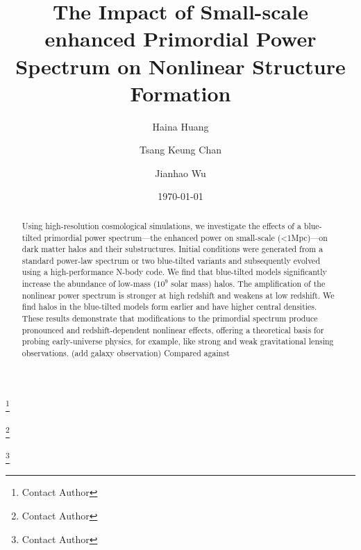\documentclass[
 reprint,
 superscriptaddress,
 nofootinbib,
 nobibnotes,
 amsmath,
 amssymb,
 aps,
 prd,
 floatfix,
 longbibliography
]{revtex4-1}
\begin{document}
\title{The Impact of Small-scale enhanced Primordial Power Spectrum on Nonlinear Structure Formation}

\author{Haina Huang}
\thanks{\scriptsize \!\! Contact Author}

\author{Tsang Keung Chan}
\thanks{\scriptsize \!\! Contact Author}

\author{Jianhao Wu}
\thanks{\scriptsize \!\! Contact Author}

\date{\today}

\begin{abstract}
Using high-resolution cosmological simulations, we investigate the effects of a blue-tilted primordial power spectrum---the enhanced power on small-scale (<1Mpc)---on dark matter halos and their substructures. Initial conditions were generated from a standard power-law spectrum or two blue-tilted variants and subsequently evolved using a high-performance N-body code. We find that blue-tilted models significantly increase the abundance of low-mass ($10^9$ solar mass) halos. The amplification of the nonlinear power spectrum is stronger at high redshift and weakens at low redshift. We find halos in the blue-tilted models form earlier and have higher central densities. These results demonstrate that modifications to the primordial spectrum produce pronounced and redshift-dependent nonlinear effects, offering a theoretical basis for probing early-universe physics, for example, like strong and weak gravitational lensing observations. {\color{red}(add galaxy observation) Compared against }
\end{abstract}

\maketitle
\end{document}
